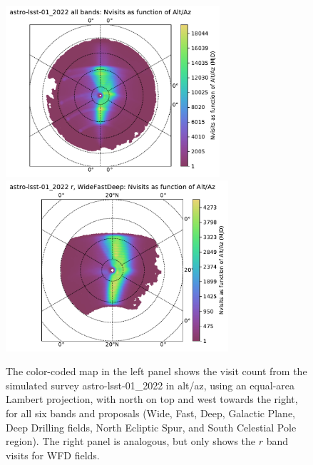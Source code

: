 \documentclass[DM,authoryear,toc]{lsstdoc}
\begin{document}
\begin{figure}[htb]
\centering
\vskip -0.0in
\includegraphics[height=2.5in]{figures/astro-lsst-01_2022_Nvisits_as_function_of_Alt_Az_all_observations_HEAL_SkyMap}
\includegraphics[height=2.5in]{figures/astro-lsst-01_2022_Nvisits_as_function_of_Alt_Az_r_WideFastDeep_HEAL_SkyMap}
\vskip -0.1in
\caption{The color-coded map in the left panel shows the visit count from the
simulated survey astro-lsst-01\_2022 in alt/az, using an equal-area Lambert projection, 
with north on top and west towards the right, for all six bands and proposals 
(Wide, Fast, Deep, Galactic Plane, Deep Drilling fields, North Ecliptic Spur, and South Celestial Pole region). 
The right panel is analogous, but only shows the $r$ band visits for WFD fields.}
\label{fig:baseline_AltAz}
\end{figure}
\end{document}
